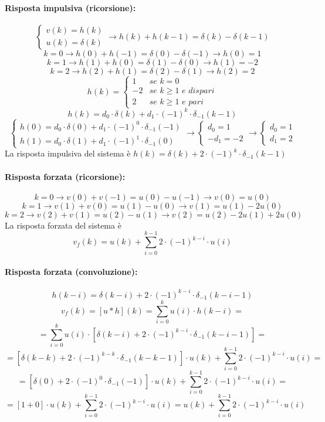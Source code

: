\documentclass[a4paper,oneside,titlepage]{book}
\begin{document}
\paragraph{Risposta impulsiva (ricorsione):}
\[
\begin{cases}
v(k) = h(k) \\
u(k) = \delta(k)
\end{cases}
\longrightarrow
h(k) + h(k-1) = \delta(k) - \delta(k-1)
\]
\[
k=0
\longrightarrow
h(0) + h(-1) = \delta(0) - \delta(-1)
\longrightarrow
h(0) = 1
\]
\[
k=1
\longrightarrow
h(1) + h(0) = \delta(1) - \delta(0)
\longrightarrow
h(1) = -2
\]
\[
k=2
\longrightarrow
h(2) + h(1) = \delta(2) - \delta(1)
\longrightarrow
h(2) = 2
\]
\[
h(k) =
\begin{cases}
1& se \,\, k = 0 \\
-2& se \,\, k \geq 1 \,\, e \,\, dispari \\
2& se \,\, k \geq 1 \,\, e \,\, pari
\end{cases}
\]
\[ h(k) = d_0 \cdot \delta(k) + d_1 \cdot (-1)^k \cdot \delta_{-1}(k-1) \]
\[
\begin{cases}
h(0) = d_0 \cdot \delta(0) + d_1 \cdot (-1)^0 \cdot \delta_{-1}(-1) \\
h(1) = d_0 \cdot \delta(1) + d_1 \cdot (-1)^1 \cdot \delta_{-1}(0)
\end{cases}
\longrightarrow
\begin{cases}
d_0 = 1 \\
- d_1 = - 2
\end{cases}
\longrightarrow
\begin{cases}
d_0 = 1 \\
d_1 = 2
\end{cases}
\]
La risposta impulsiva del sistema è $h(k) = \delta(k) + 2 \cdot (-1)^k \cdot \delta_{-1}(k-1)$

\paragraph{Risposta forzata (ricorsione):}
\[
k=0
\longrightarrow
v(0) + v(-1) = u(0) - u(-1)
\longrightarrow
v(0) = u(0)
\]
\[
k=1
\longrightarrow
v(1) + v(0) = u(1) - u(0)
\longrightarrow
v(1) = u(1) - 2u(0)
\]
\[
k=2
\longrightarrow
v(2) + v(1) = u(2) - u(1)
\longrightarrow
v(2) = u(2) - 2u(1) + 2u(0)
\]
La risposta forzata del sistema è
\[ v_f(k) = u(k) + \sum_{i=0}^{k-1} 2 \cdot (-1)^{k-i} \cdot u(i) \]

\paragraph{Risposta forzata (convoluzione):}
\[ h(k-i) = \delta(k-i) + 2 \cdot (-1)^{k-i} \cdot \delta_{-1}(k-i-1) \]
\[ v_f(k) = [u*h](k) = \sum_{i=0}^k u(i) \cdot h(k-i) = \]
\[ = \sum_{i=0}^k u(i) \cdot [\delta(k-i) + 2 \cdot (-1)^{k-i} \cdot \delta_{-1}(k-i-1)] = \]
\[ = [\delta(k-k) + 2 \cdot (-1)^{k-k} \cdot \delta_{-1}(k-k-1)] \cdot u(k) + \sum_{i=0}^{k-1} 2 \cdot (-1)^{k-i} \cdot u(i) = \]
\[ = [\delta(0) + 2 \cdot (-1)^{0} \cdot \delta_{-1}(-1)] \cdot u(k) + \sum_{i=0}^{k-1} 2 \cdot (-1)^{k-i} \cdot u(i) = \]
\[ = [1 + 0] \cdot u(k) + \sum_{i=0}^{k-1} 2 \cdot (-1)^{k-i} \cdot u(i) = u(k) + \sum_{i=0}^{k-1} 2 \cdot (-1)^{k-i} \cdot u(i) \]
\end{document}
